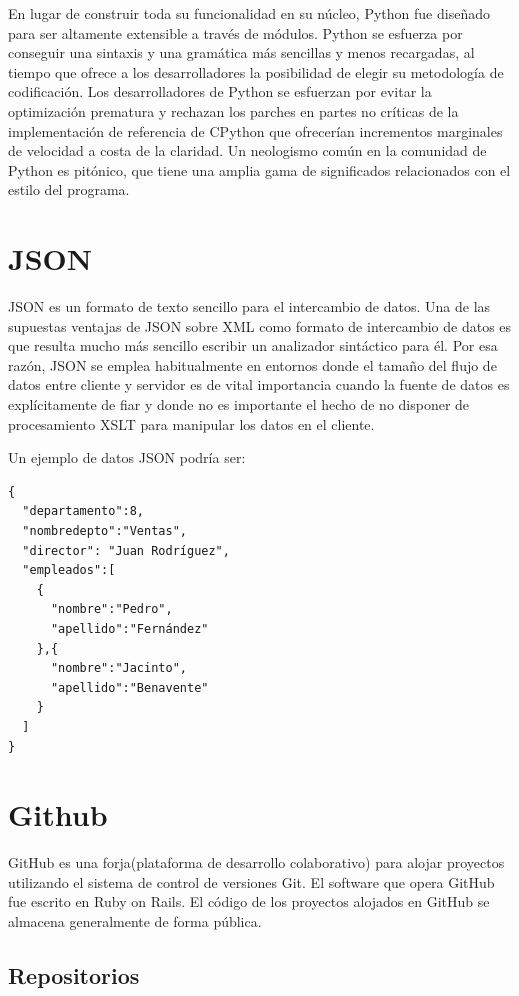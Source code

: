 \documentclass[a4paper, 12pt]{book}
\begin{document}
En lugar de construir toda su funcionalidad en su núcleo, Python fue diseñado para ser altamente extensible a través de módulos. Python se esfuerza por conseguir una sintaxis y una gramática más sencillas y menos recargadas, al tiempo que ofrece a los desarrolladores la posibilidad de elegir su metodología de codificación. Los desarrolladores de Python se esfuerzan por evitar la optimización prematura y rechazan los parches en partes no críticas de la implementación de referencia de CPython que ofrecerían incrementos marginales de velocidad a costa de la claridad.
Un neologismo común en la comunidad de Python es pitónico, que tiene una amplia gama de significados relacionados con el estilo del programa.


\section{JSON}
\label{sec:JSON}

JSON\cite{website:JSON} es un formato de texto sencillo para el intercambio de datos. Una de las supuestas ventajas de JSON sobre XML como formato de intercambio de datos es que resulta mucho más sencillo escribir un analizador sintáctico para él. Por esa razón, JSON se emplea habitualmente en entornos donde el tamaño del flujo de datos entre cliente y servidor es de vital importancia cuando la fuente de datos es explícitamente de fiar y donde no es importante el hecho de no disponer de procesamiento XSLT para manipular los datos en el cliente.

Un ejemplo de datos JSON podría ser:
{\footnotesize
\begin{verbatim}
{
  "departamento":8,
  "nombredepto":"Ventas",
  "director": "Juan Rodríguez",
  "empleados":[
    {
      "nombre":"Pedro",
      "apellido":"Fernández"
    },{
      "nombre":"Jacinto",
      "apellido":"Benavente"
    } 
  ]
}
\end{verbatim}
}

\section{Github}
\label{sec:Github}

GitHub\cite{website:GitHub} es una forja(plataforma de desarrollo colaborativo) para alojar proyectos utilizando el sistema de control de versiones Git. El software que opera GitHub fue escrito en Ruby on Rails. El código de los proyectos alojados en GitHub se almacena generalmente de forma pública.

\subsection{Repositorios}
\end{document}
